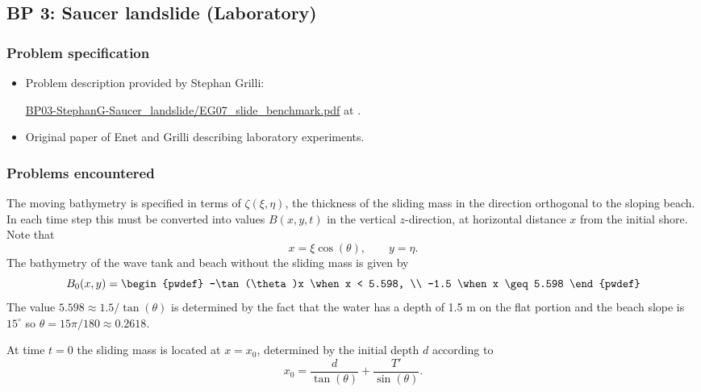 \newsection
\subsection{BP 3:    
 Saucer landslide (Laboratory)}

\subsubsection{Problem specification}

\begin{itemize}


\item Problem description provided by Stephan Grilli:

\href{https://github.com/rjleveque/nthmp-benchmark-problems/blob/master/BP03-StephanG-Saucer_landslide/EG07_slide_benchmark.pdf}
{BP03-StephanG-Saucer\_landslide/EG07\_slide\_benchmark.pdf} 
at \cite{bp-description}.  

\item Original paper of Enet and Grilli \cite{EnetGrilli}
describing laboratory experiments.

\end{itemize} 

\subsubsection{Problems encountered}

The moving bathymetry is specified in terms of $\zeta(\xi,\eta)$,
the thickness of the sliding mass 
in the direction orthogonal to the sloping beach.  In each time step this must
be converted into values $B(x,y,t)$ in the vertical $z$-direction, 
at horizontal distance $x$ from the initial shore.  Note that
\[
x = \xi \cos(\theta), \qquad y = \eta.
\]
The bathymetry of the wave tank and beach without the sliding mass is given by
\[
B_0(x,y) = \begin{pwdef} 
  -\tan(\theta)x \when x < 5.598, \\
  -1.5 \when x \geq 5.598 \end{pwdef}
\]
The value $5.598 \approx 1.5 / \tan(\theta)$ is determined by the fact that the
water has a depth of 1.5 m on the flat portion and the beach slope is
$15^\circ$ so $\theta = 15\pi/180 \approx 0.2618$.

At time $t=0$ the sliding mass is located at $x=x_0$, determined by the
initial depth $d$ according to
\[
x_0 = \frac{d}{\tan(\theta)} + \frac{T'}{\sin(\theta)}.
\]

